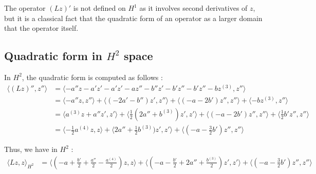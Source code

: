 \documentclass[11pt,a4paper]{article}
\begin{document}
\begin{rmq}
The operator $(Lz)'$ is not defined on $H^1$ as it involves second derivatives of $z$, but it is a classical fact that the quadratic form of an operator as a larger domain that the operator itself.
\end{rmq}

\subsection{Quadratic form in $H^2$ space}
In $H^2$, the quadratic form is computed as follows :
\begin{align*}
  \langle (Lz)'', z'' \rangle   &=    \langle -a''z-a'z'-a'z'-az''- b''z'-b'z''-b'z''-bz^{(3)}, z'' \rangle \\
  &= \langle -a''z, z'' \rangle +  \langle (-2a'- b'')z', z'' \rangle +  \langle (-a-2b')z'', z'' \rangle + \langle -bz^{(3)}, z'' \rangle \\
  &= \langle a^{(3)}z+ a''z', z' \rangle +  \langle \frac{1}{2} (2a''+ b^{(3)})z', z' \rangle +  \langle (-a-2b')z'', z'' \rangle + \langle \frac{1}{2} b'z'', z'' \rangle \\
  &= \langle - \frac{1}{2}a^{(4)}z, z \rangle +  \langle 2a''+ \frac{1}{2} b^{(3)})z', z' \rangle +  \langle (-a- \frac{3}{2} b')z'', z'' \rangle 
\end{align*}

Thus, we have in $H^2$ :
\begin{align*}
  \langle Lz, z \rangle_{H^2}   &=  \langle (-a+ \frac{b'}{2}+\frac{a''}{2}-\frac{a^{(4)}}{2})z, z \rangle +  \langle (-a-\frac{b'}{2} +2a''+ \frac{ b^{(3)}}{2})z', z' \rangle +  \langle (-a- \frac{3}{2} b')z'', z'' \rangle 
\end{align*}
\end{document}
